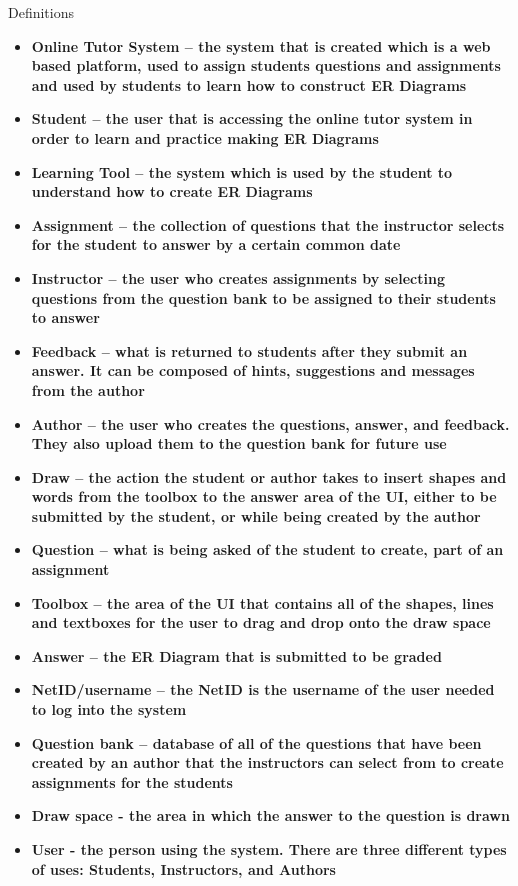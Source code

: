	\begin{section}{Definitions}
 		\begin{itemize}
 			\item{\bf{Online Tutor System} – the system that is created which is a web based platform, 
 			used to assign students questions and assignments and used by students to learn how to 
 			construct ER Diagrams}
			\item{\bf{Student} – the user that is accessing the online tutor system in order to learn 
			and practice making ER Diagrams}
			\item{\bf{Learning Tool} – the system which is used by the student to understand how to 
			create ER Diagrams}
			\item{\bf{Assignment} – the collection of questions that the instructor selects for the 
			student to answer by a certain common date}
			\item{\bf{Instructor} – the user who creates assignments by selecting questions from the 
			question bank to be assigned to their students to answer}
			\item{\bf{Feedback} – what is returned to students after they submit an answer.  It can be 
			composed of hints, suggestions and messages from the author}
			\item{\bf{Author} – the user who creates the questions, answer, and feedback.  They also 
			upload them to the question bank for future use}
			\item{\bf{Draw} – the action the student or author takes to insert shapes and words from 
			the toolbox to the answer area of the UI, either to be submitted by the student, or while 
			being created by the author}
			\item{\bf{Question} – what is being asked of the student to create, part of an assignment}
			\item{\bf{Toolbox} – the area of the UI that contains all of the shapes, lines and textboxes 
			for the user to drag and drop onto the draw space}
			\item{\bf{Answer} – the ER Diagram that is submitted to be graded}
			\item{\bf{NetID/username} – the NetID is the username of the user needed to log into the 
			system}
			\item{\bf{Question bank} – database of all of the questions that have been created by an 
			author that the instructors can select from to create assignments for the students}
			\item{\bf{Draw space} - the area in which the answer to the question is drawn}
			\item{\bf{User} - the person using the system. There are three different types of uses: 
			Students, Instructors, and Authors}
		\end{itemize}
	\end{section}
